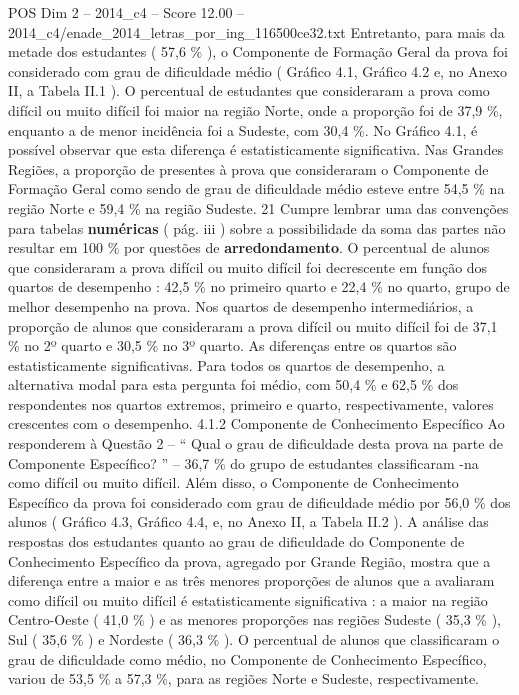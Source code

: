 \begin{textsample}{POS Dim 2 – 2014\_c4 – Score 12.00 – 2014\_c4/enade\_2014\_letras\_por\_ing\_116500ce32.txt}
Entretanto, para mais da metade dos estudantes ( 57,6 \% ), o Componente de Formação Geral da prova foi considerado com grau de dificuldade médio ( Gráfico 4.1, Gráfico 4.2 e, no Anexo II, a Tabela II.1 ).
O percentual de estudantes que consideraram a prova como difícil ou muito difícil foi maior na região Norte, onde a proporção foi de 37,9 \%, enquanto a de menor incidência foi a Sudeste, com 30,4 \%.
No Gráfico 4.1, é possível observar que esta diferença é estatisticamente significativa.
Nas Grandes Regiões, a proporção de presentes à prova que consideraram o Componente de Formação Geral como sendo de grau de dificuldade médio esteve entre 54,5 \% na região Norte e 59,4 \% na região Sudeste. 21 Cumpre lembrar uma das convenções para tabelas \textbf{numéricas} ( pág. iii ) sobre a possibilidade da soma das partes não resultar em 100 \% por questões de \textbf{arredondamento}.
O percentual de alunos que consideraram a prova difícil ou muito difícil foi decrescente em função dos quartos de desempenho : 42,5 \% no primeiro quarto e 22,4 \% no quarto, grupo de melhor desempenho na prova.
Nos quartos de desempenho intermediários, a proporção de alunos que consideraram a prova difícil ou muito difícil foi de 37,1 \% no 2º quarto e 30,5 \% no 3º quarto.
As diferenças entre os quartos são estatisticamente significativas.
Para todos os quartos de desempenho, a alternativa modal para esta pergunta foi médio, com 50,4 \% e 62,5 \% dos respondentes nos quartos extremos, primeiro e quarto, respectivamente, valores crescentes com o desempenho. 4.1.2 Componente de Conhecimento Específico Ao responderem à Questão 2 – “ Qual o grau de dificuldade desta prova na parte de Componente Específico? ” – 36,7 \% do grupo de estudantes classificaram -na como difícil ou muito difícil.
Além disso, o Componente de Conhecimento Específico da prova foi considerado com grau de dificuldade médio por 56,0 \% dos alunos ( Gráfico 4.3, Gráfico 4.4, e, no Anexo II, a Tabela II.2 ).
A análise das respostas dos estudantes quanto ao grau de dificuldade do Componente de Conhecimento Específico da prova, agregado por Grande Região, mostra que a diferença entre a maior e as três menores proporções de alunos que a avaliaram como difícil ou muito difícil é estatisticamente significativa : a maior na região Centro-Oeste ( 41,0 \% ) e as menores proporções nas regiões Sudeste ( 35,3 \% ), Sul ( 35,6 \% ) e Nordeste ( 36,3 \% ).
O percentual de alunos que classificaram o grau de dificuldade como médio, no Componente de Conhecimento Específico, variou de 53,5 \% a 57,3 \%, para as regiões Norte e Sudeste, respectivamente.

\end{textsample}

